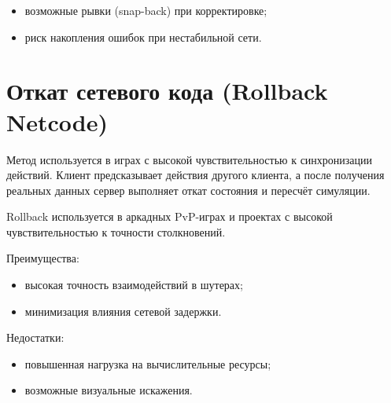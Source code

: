\begin{itemize}
    \item возможные рывки (snap-back) при корректировке;
    \item риск накопления ошибок при нестабильной сети.
\end{itemize}

\section{Откат сетевого кода (Rollback Netcode)}

Метод используется в играх с высокой чувствительностью к синхронизации действий. Клиент
предсказывает действия другого клиента, а после получения реальных данных сервер выполняет откат\cite{ggpo}
состояния и пересчёт симуляции.

Rollback используется в аркадных PvP-играх и проектах с высокой чувствительностью к точности столкновений.


Преимущества:

\begin{itemize}
    \item высокая точность взаимодействий в шутерах;
    \item минимизация влияния сетевой задержки.
\end{itemize}

Недостатки:

\begin{itemize}
    \item повышенная нагрузка на вычислительные ресурсы;
    \item возможные визуальные искажения.
\end{itemize}
